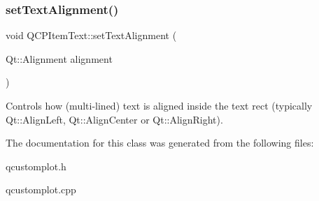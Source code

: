 \subsubsection{\texorpdfstring{set\+Text\+Alignment()}{setTextAlignment()}}
{\footnotesize\ttfamily void Q\+C\+P\+Item\+Text\+::set\+Text\+Alignment (\begin{DoxyParamCaption}\item[{Qt\+::\+Alignment}]{alignment }\end{DoxyParamCaption})}

Controls how (multi-\/lined) text is aligned inside the text rect (typically Qt\+::\+Align\+Left, Qt\+::\+Align\+Center or Qt\+::\+Align\+Right). 

The documentation for this class was generated from the following files\+:\begin{DoxyCompactItemize}
\item 
qcustomplot.\+h\item 
qcustomplot.\+cpp\end{DoxyCompactItemize}
